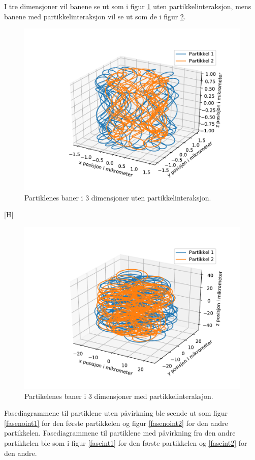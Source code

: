 \documentclass[reprint,english,notitlepage]{revtex4-1}  %
\begin{document}
I tre dimensjoner vil banene se ut som i figur \ref{3dnoint} uten partikkelinteraksjon, mens banene med partikkelinteraksjon vil se ut som de i figur \ref{3dint}.
\begin{figure}[H]
	\label{3dnoint}
	\centering
	\includegraphics[scale=0.4]{../pythonplots/3dr2noint.pdf}
	\caption{Partiklenes baner i 3 dimensjoner uten partikkelinteraksjon.}
\end{figure}[H]
\begin{figure}
	\label{3dint}
	\centering
	\includegraphics[scale=0.4]{../pythonplots/3dr2int.pdf}
	\caption{Partikelenes baner i 3 dimensjoner med partikkelinteraksjon.}
\end{figure}
Fasediagrammene til partiklene uten påvirkning ble seende ut som figur \ref{fasenoint1} for den første partikkelen og figur \ref{fasenoint2} for den andre partikkelen. Fasediagrammene til partiklene med påvirkning fra den andre partikkelen ble som i figur \ref{faseint1} for den første partikkelen og \ref{faseint2} for den andre.
\end{document}
